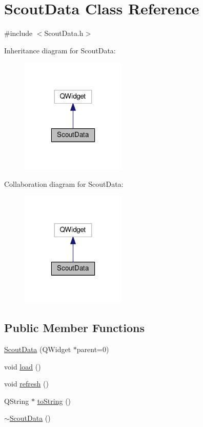 \hypertarget{class_scout_data}{\section{Scout\-Data Class Reference}
\label{class_scout_data}
}


{\ttfamily \#include $<$Scout\-Data.\-h$>$}



Inheritance diagram for Scout\-Data\-:\nopagebreak
\begin{figure}[H]
\begin{center}
\leavevmode
\includegraphics[width=142pt]{class_scout_data__inherit__graph}
\end{center}
\end{figure}


Collaboration diagram for Scout\-Data\-:\nopagebreak
\begin{figure}[H]
\begin{center}
\leavevmode
\includegraphics[width=142pt]{class_scout_data__coll__graph}
\end{center}
\end{figure}
\subsection*{Public Member Functions}
\begin{DoxyCompactItemize}
\item 
\hyperlink{class_scout_data_a041db00fde426fd5122c3e33d2b78ad5}{Scout\-Data} (Q\-Widget $\ast$parent=0)
\item 
void \hyperlink{class_scout_data_aa9d58dc0fd1e9868547ed7f2019265c6}{load} ()
\item 
void \hyperlink{class_scout_data_ac001d4173ac831c5ed3fc6393ac4b7b8}{refresh} ()
\item 
Q\-String $\ast$ \hyperlink{class_scout_data_a347900787f5eebdf6c1ba12420f73a9b}{to\-String} ()
\item 
\hyperlink{class_scout_data_acd123ae5750a411fcb37774af17ea68d}{$\sim$\-Scout\-Data} ()
\end{DoxyCompactItemize}
